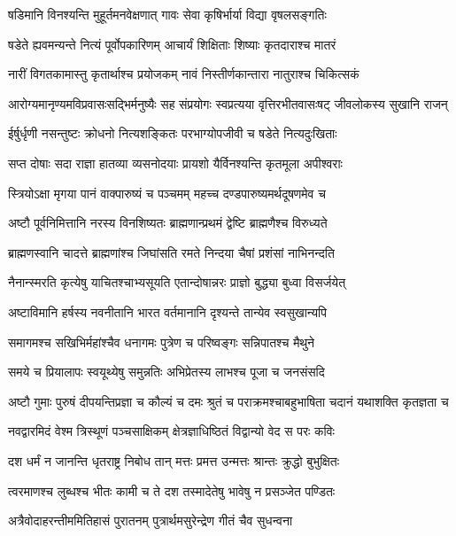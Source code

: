 \twolineshloka
{षडिमानि विनश्यन्ति मुहूर्तमनवेक्षणात्}
{गावः सेवा कृषिर्भार्या विद्या वृषलसङ्गतिः}


\twolineshloka
{षडेते ह्यवमन्यन्ते नित्यं पूर्वोपकारिणम्}
{आचार्यं शिक्षिताः शिष्याः कृतदाराश्च मातरं}


\twolineshloka
{नारीं विगतकामास्तु कृतार्थाश्च प्रयोजकम्}
{नावं निस्तीर्णकान्तारा नातुराश्च चिकित्सकं}


\twolineshloka
{आरोग्यमानृण्यमविप्रवासःसद्भिर्मनुष्यैः सह संप्रयोगः}
{स्वप्रत्यया वृत्तिरभीतवासःषट् जीवलोकस्य सुखानि राजन्}


\twolineshloka
{ईर्षुर्धृणी नसन्तुष्टः क्रोधनो नित्यशङ्कितः}
{परभाग्योपजीवी च षडेते नित्यदुःखिताः}


\twolineshloka
{सप्त दोषाः सदा राज्ञा हातव्या व्यसनोदयाः}
{प्रायशो यैर्विनश्यन्ति कृतमूला अपीश्वराः}


\twolineshloka
{स्त्रियोऽक्षा मृगया पानं वाक्पारुष्यं च पञ्चमम्}
{महच्च दण्डपारुष्यमर्थदूषणमेव च}


\twolineshloka
{अष्टौ पूर्वनिमित्तानि नरस्य विनशिष्यतः}
{ब्राह्मणान्प्रथमं द्वेष्टि ब्राह्मणैश्च विरुध्यते}


\twolineshloka
{ब्राह्मणस्वानि चादत्ते ब्राह्मणांश्च जिघांसति}
{रमते निन्दया चैषां प्रशंसां नाभिनन्दति}


\twolineshloka
{नैनान्स्मरति कृत्येषु याचितश्चाभ्यसूयति}
{एतान्दोषान्नरः प्राज्ञो बुद्ध्या बुध्वा विसर्जयेत्}


\twolineshloka
{अष्टाविमानि हर्षस्य नवनीतानि भारत}
{वर्तमानानि दृश्यन्ते तान्येव स्वसुखान्यपि}


\twolineshloka
{समागमश्च सखिभिर्महांश्चैव धनागमः}
{पुत्रेण च परिष्वङ्गः सन्निपातश्च मैथुने}


\twolineshloka
{समये च प्रियालापः स्वयूथ्येषु समुन्नतिः}
{अभिप्रेतस्य लाभश्च पूजा च जनसंसदि}


\twolineshloka
{अष्टौ गुमाः पुरुषं दीपयन्तिप्रज्ञा च कौल्यं च दमः श्रुतं च}
{पराक्रमश्चाबहुभाषिता चदानं यथाशक्ति कृतज्ञता च}


\twolineshloka
{नवद्वारमिदं वेश्म त्रिस्थूणं पञ्चसाक्षिकम्}
{क्षेत्रज्ञाधिष्ठितं विद्वान्यो वेद स परः कविः}


\twolineshloka
{दश धर्मं न जानन्ति धृतराष्ट्र निबोध तान्}
{मत्तः प्रमत्त उन्मत्तः श्रान्तः क्रुद्धो बुभुक्षितः}


\twolineshloka
{त्वरमाणश्च लुब्धश्च भीतः कामी च ते दश}
{तस्मादेतेषु भावेषु न प्रसञ्जेत पण्डितः}


\twolineshloka
{अत्रैवोदाहरन्तीममितिहासं पुरातनम्}
{पुत्रार्थमसुरेन्द्रेण गीतं चैव सुधन्वना}



